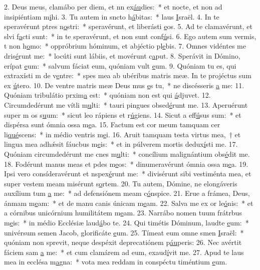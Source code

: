 2. Deus meus, clamábo per diem, et nn ex\uline{áu}dies:~* et nocte, et non ad insipiéntiam m\uline{i}hi.
3. Tu autem in sncto h\uline{á}bitas:~* laus \uline{I}sraël.
4. In te speravérunt ptres n\uline{o}stri:~* speravérunt, et liberásti \uline{e}os.
5. Ad te clamavérunt, et slvi f\uline{a}cti sunt:~* in te speravérunt, et non sunt conf\uline{ú}si.
6. Ego autem sum vermis, t non h\uline{o}mo:~* oppróbrium hóminum, et abjéctio pl\uline{e}bis.
7. Omnes vidéntes me dris\uline{é}runt me:~* locúti sunt lábiis, et movérunt c\uline{a}put.
8. Sperávit in Dómino, erípat \uline{e}um:~* salvum fáciat eum, quóniam vult \uline{e}um.
9. Quóniam tu es, qui extraxísti m de v\uline{e}ntre:~* spes mea ab ubéribus matris meæ. In te projéctus sum ex \uline{ú}tero.
10. De ventre matris meæ Deus mus \uline{e}s tu,~* ne discésseris \uline{a} me:
11. Quóniam tribulátio prxim\uline{a} est:~* quóniam non est qui \uline{á}djuvet.
12. Circumdedérunt me vítli m\uline{u}lti:~* tauri pingues obsed\uline{é}runt me.
13. Aperuérunt super m os s\uline{u}um:~* sicut leo rápiens et r\uline{ú}giens.
14. Sicut a eff\uline{ú}sus sum:~* et dispérsa sunt ómnia ossa m\uline{e}a.
15. Factum est cor meum tamquam cer li\uline{qué}scens:~* in médio ventris m\uline{e}i.
16. Aruit tamquam testa virtus mea,~† et lingua mea adhǽsit fáucbus m\uline{e}is:~* et in púlverem mortis dedux\uline{í}sti me.
17. Quóniam circumdedérunt me cnes m\uline{u}lti:~* concílium malignántium obs\uline{é}dit me.
18. Fodérunt manus meas et pdes m\uline{e}os:~* dinumeravérunt ómnia ossa m\uline{e}a.
19. Ipsi vero consíderavérunt et nspex\uline{é}runt me:~* divisérunt sibi vestiménta mea, et super vestem meam misérunt s\uline{o}rtem.
20. Tu autem, Dómine, ne elongáveris auxílium tum \uline{a} me:~* ad defensiónem meam c\uline{ó}nspice.
21. Erue a frámea, Deus, ánmam m\uline{e}am:~* et de manu canis únicam m\uline{e}am.
22. Salva me ex or le\uline{ó}nis:~* et a córnibus unicórnium humilitátem m\uline{e}am.
23. Narrábo nomen tuum frátrbus m\uline{e}is:~* in médio Ecclésiæ laud\uline{á}bo te.
24. Qui timétis Dóminum, laudte \uline{e}um:~* univérsum semen Jacob, glorificáte \uline{e}um.
25. Tímeat eum omne smen \uline{I}sraël:~* quóniam non sprevit, neque despéxit deprecatiónem p\uline{áu}peris:
26. Nec avértit fáciem sam \uline{a} me:~* et cum clamárem ad eum, exaud\uline{í}vit me.
27. Apud te laus mea in ecclésa m\uline{a}gna:~* vota mea reddam in conspéctu timéntium \uline{e}um.
